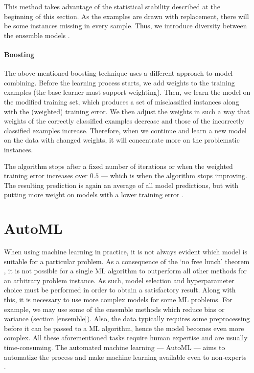 This method takes advantage of the statistical stability described at the
beginning of this section. As the examples are drawn with replacement, there
will be some instances missing in every sample. Thus, we introduce diversity
between the ensemble models \citep[331]{Flach:2012:MLA:2490546}.

\paragraph{Boosting} \label{boosting}
The above-mentioned boosting technique uses a different approach to model
combining. Before the learning process starts, we add weights to the training 
examples (the base-learner must support weighting). Then, we learn the model
on the modified training set, which produces a set of misclassified instances
along with the (weighted) training error. We then adjust the weights in such a
way that weights of the correctly classified examples decrease and those of
the incorrectly classified examples increase. Therefore, when we continue and
learn a new model on the data with changed weights, it will concentrate more 
on the problematic instances.

The algorithm stops after a fixed number of iterations or when the weighted
training error increases over $0.5$ --- which is when the algorithm stops
improving. The resulting prediction is again an average of all model
predictions, but with putting more weight on models with a lower training
error \citep[335]{Flach:2012:MLA:2490546}.

\section{AutoML} \label{sec:automl}
When using machine learning in practice, it is not always evident which model
is suitable for a particular problem. As a consequence of the `no free lunch'
theorem \citep{585893}, it is not possible for a single ML algorithm to
outperform all other methods for an arbitrary problem instance. As such, model
selection and hyperparameter choice must be performed in order to obtain a 
satisfactory result. Along with this, it is necessary to use more complex
models for some ML problems. For example, we may use some of the ensemble
methods which reduce bias or variance (section \ref{ensemble}). Also, the data
typically requires some preprocessing before it can be passed to a ML
algorithm, hence the model becomes even more complex. All these aforementioned
tasks require human  expertise and are usually time-consuming. The automated
machine learning --- AutoML --- aims to automatize the process and make
machine learning available even to non-experts \citep{Zller2019SurveyOA}.

